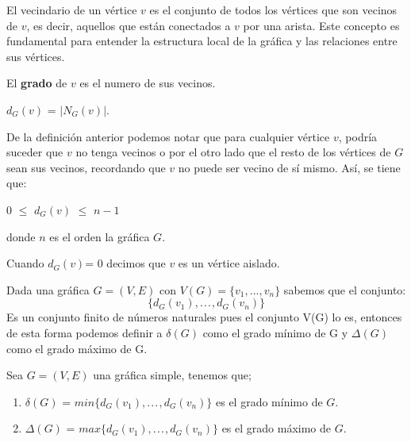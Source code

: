 \noindent El vecindario de un vértice $v$ es el conjunto de todos los vértices que son vecinos de $v$, es decir, aquellos que están conectados a $v$ por una arista. Este concepto es fundamental para entender la estructura local de la gráfica y las relaciones entre sus vértices.
    
\begin{definition}
    El \textbf{grado} de $v$ es el numero de sus vecinos.
    \begin{center}
        $d_{G}(v)$ = $|N_G(v)|$.
    \end{center}  
\end{definition}

\noindent De la definición anterior podemos notar que para cualquier vértice $v$, podría suceder que $v$ no tenga vecinos o por el otro lado que el resto de los vértices de $G$ sean sus vecinos, recordando que $v$ no puede ser vecino de sí mismo. Así, se tiene que:
    \begin{center}
        0 $\leq$ $d_G(v)$ $\leq$ $n-1$
    \end{center} 
    donde $n$ es el orden la gráfica $G$.

    \begin{definition}

    Cuando $d_G(v)$= 0 decimos que $v$ es un vértice aislado.
    \end{definition}
    
    \noindent Dada una gráfica $G = (V,E)$ con $V(G) = \{v_1,...,v_n\}$ sabemos que el conjunto:
    \[\{d_G(v_1),.\hspace{1pt} . \hspace{1pt}.\hspace{1pt},d_G(v_n)\}\]
    Es un conjunto finito de números naturales pues el conjunto V(G) lo es, entonces de esta forma podemos definir a $\delta(G)$ como el grado mínimo de G y $\Delta(G)$ como el grado máximo de G.

    \begin{definition}
    Sea $G = (V,E)$ una gráfica simple, tenemos que;
    \begin{enumerate}
        \item  $\delta(G)$ = $min\{d_G(v_1),.\hspace{1pt}.\hspace{1pt}.\hspace{1pt},d_G(v_n)\}$ es el grado mínimo de $G$.
        \item $\Delta(G)$ = $max\{d_G(v_1),.\hspace{1pt}.\hspace{1pt}.\hspace{1pt},d_G(v_n)\}$ es el grado máximo de $G$.
    \end{enumerate}      
    \end{definition}

